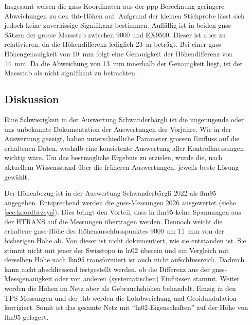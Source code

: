 Insgesamt weisen die \acrshort{gnss}-Koordinaten aus der \acrshort{ppp}-Berechnung geringere Abweichungen zu den \acrshort{thb}-Höhen auf. Aufgrund der 
kleinen Stichprobe lässt sich jedoch keine zuverlässige Signifikanz bestimmen. Auffällig ist in beiden \acrshort{gnss}-Sätzen der 
grosse Massstab zwischen 9000 und EX9500. Dieser ist aber zu relativieren, da die Höhendifferenz lediglich 23~m beträgt. 
Bei einer \acrshort{gnss}-Höhengenauigkeit von 10~mm folgt eine Genauigkeit der Höhendifferenz von 14~mm. Da die Abweichung von 13~mm innerhalb 
der Genauigkeit liegt, ist der Massstab als nicht signifikant zu betrachten.


\subsection{Diskussion}
\label{sec:diskussion_Schwanderbärgli}
Eine Schwierigkeit in der Auswertung Schwanderbärgli ist die ungenügende oder uns unbekannte Dokumentation der 
Auswertungen der Vorjahre. Wie in der Auswertung gezeigt, haben unterschiedliche Parameter grossen Einfluss 
auf die erhaltenen Daten, weshalb eine konsistente Auswertung aller Kontrollmessungen wichtig wäre. Um das bestmögliche 
Ergebnis zu erzielen, wurde die, nach aktuellem Wissensstand über die früheren Auswertungen, jeweils beste Lösung gewählt.

Der Höhenbezug ist in der Auswertung Schwanderbärgli 2022 als \gls{lhn95} angegeben. Entsprechend werden die \acrshort{gnss}-Messungen 2026 ausgewertet 
(siehe \ref{sec:koordbezsys}). 
Dies bringt den Vorteil, dass in \gls{lhn95} keine Spannungen aus der HTRANS auf die Messungen übertragen werden. Dennoch 
weicht die erhaltene \acrshort{gnss}-Höhe des Höhenanschlusspunktes 9000 um 11~mm von der bisherigen Höhe ab. Von dieser ist  
nicht dokumentiert, wie sie entstanden ist. Sie stimmt nicht mit jener der Swisstopo in \gls{ln02} überein und ein Vergleich mit derselben Höhe nach 
\gls{lhn95} transformiert ist auch nicht aufschlussreich. Dadurch kann nicht abschliessend festgestellt werden, ob die Differenz aus der 
\acrshort{gnss}-Messgenauigkeit oder von anderen (systematischen) Einflüssen stammt. Weiter werden die Höhen im Netz aber als Gebrauchshöhen
behandelt. Einzig in den TPS-Messungen und der \gls{thb} werden die Lotabweichung und Geoidundulation
korrigiert. Somit ist das gesamte Netz mit ``\acrshort{ln02}-Eigenschaften'' auf der Höhe von \gls{lhn95} gelagert.

